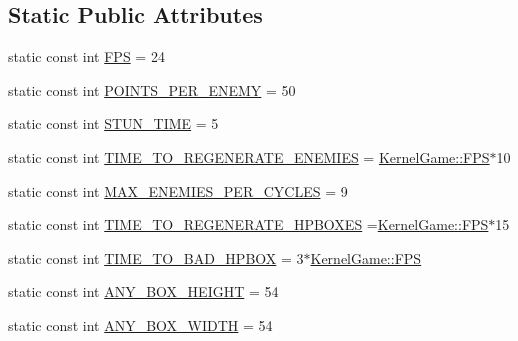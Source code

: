 \subsection*{Static Public Attributes}
\begin{DoxyCompactItemize}
\item 
static const int \hyperlink{class_kernel_game_a39826abf0f1c1dac2d5d7880554fc3f5}{F\-P\-S} = 24
\item 
static const int \hyperlink{class_kernel_game_a50c001388beca95ededf7b451c92325f}{P\-O\-I\-N\-T\-S\-\_\-\-P\-E\-R\-\_\-\-E\-N\-E\-M\-Y} = 50
\item 
static const int \hyperlink{class_kernel_game_a82732184131955ddcf19ed23ac8ff1ee}{S\-T\-U\-N\-\_\-\-T\-I\-M\-E} = 5
\item 
static const int \hyperlink{class_kernel_game_a675d437b5472685ab56be71d3cabad4f}{T\-I\-M\-E\-\_\-\-T\-O\-\_\-\-R\-E\-G\-E\-N\-E\-R\-A\-T\-E\-\_\-\-E\-N\-E\-M\-I\-E\-S} = \hyperlink{class_kernel_game_a39826abf0f1c1dac2d5d7880554fc3f5}{Kernel\-Game\-::\-F\-P\-S}$\ast$10
\item 
static const int \hyperlink{class_kernel_game_a6fb6f90123c4ad321e1358fd101ab166}{M\-A\-X\-\_\-\-E\-N\-E\-M\-I\-E\-S\-\_\-\-P\-E\-R\-\_\-\-C\-Y\-C\-L\-E\-S} = 9
\item 
static const int \hyperlink{class_kernel_game_a30ec2e5873f5d310826a0c56f9743997}{T\-I\-M\-E\-\_\-\-T\-O\-\_\-\-R\-E\-G\-E\-N\-E\-R\-A\-T\-E\-\_\-\-H\-P\-B\-O\-X\-E\-S} =\hyperlink{class_kernel_game_a39826abf0f1c1dac2d5d7880554fc3f5}{Kernel\-Game\-::\-F\-P\-S}$\ast$15
\item 
static const int \hyperlink{class_kernel_game_a692c5bb0576ed461c8e83261aa4f407c}{T\-I\-M\-E\-\_\-\-T\-O\-\_\-\-B\-A\-D\-\_\-\-H\-P\-B\-O\-X} = 3$\ast$\hyperlink{class_kernel_game_a39826abf0f1c1dac2d5d7880554fc3f5}{Kernel\-Game\-::\-F\-P\-S}
\item 
static const int \hyperlink{class_kernel_game_a4481548e4416ba164f867e3f1400b2ec}{A\-N\-Y\-\_\-\-B\-O\-X\-\_\-\-H\-E\-I\-G\-H\-T} = 54
\item 
static const int \hyperlink{class_kernel_game_a76023e94d4cc0df01ddda95f0d9c200d}{A\-N\-Y\-\_\-\-B\-O\-X\-\_\-\-W\-I\-D\-T\-H} = 54
\end{DoxyCompactItemize}


